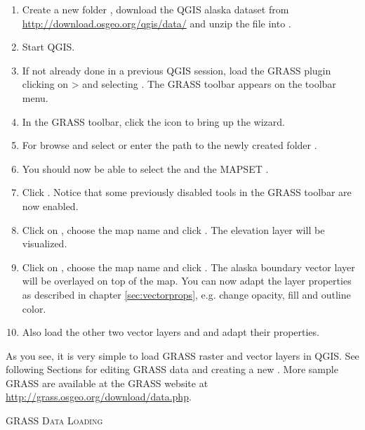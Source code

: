 \begin{enumerate}
  \item Create a new folder , download the QGIS alaska
  dataset  from
  \url{http://download.osgeo.org/qgis/data/} and unzip the file into
  . 
  \item Start QGIS.
  \item If not already done in a previous QGIS session, load the GRASS plugin
  clicking on  >  and
  selecting . The GRASS toolbar appears on the toolbar menu.
  \item In the GRASS toolbar, click the  icon to bring up the  wizard.
  \item For  browse and select or enter the path to the
  newly created folder .
  \item You should now be able to select the 
  and the MAPSET . 
  \item Click . Notice that some previously disabled tools in the 
  GRASS toolbar are now enabled.
  \item Click on ,
  choose the map name  and click . The elevation
  layer will be visualized.
  \item Click on ,
  choose the map name  and click . The alaska
  boundary vector layer will be overlayed on top of the  map. You can
  now adapt the layer properties as described in chapter \ref{sec:vectorprops},
  e.g. change opacity, fill and outline color.
  \item Also load the other two vector layers  and
   and adapt their properties.
\end{enumerate}

As you see, it is very simple to load GRASS raster and vector layers in QGIS. 
See following Sections for editing GRASS data and creating a new 
. More sample GRASS  are available at 
the GRASS website at \url{http://grass.osgeo.org/download/data.php}.

\begin{Tip}\caption{\textsc{GRASS Data Loading}}
\end{Tip} 


